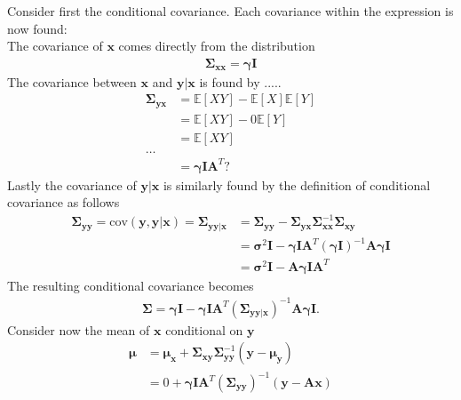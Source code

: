 Consider first the conditional covariance. Each covariance within the expression is now found:
\\
The covariance of $\textbf{x}$ comes directly from the distribution  
\begin{align*}
\boldsymbol{\Sigma}_{\textbf{xx}} = \boldsymbol{\gamma}\textbf{I}
\end{align*} 
The covariance between $\textbf{x}$ and $\textbf{y}\vert\textbf{x}$ is found by .....
\begin{align*}
\boldsymbol{\Sigma}_{\textbf{yx}} &= \mathbb{E}[XY] - \mathbb{E}[X]\mathbb{E}[Y]\\
&= \mathbb{E}[XY] - 0 \mathbb{E}[Y] \\
&= \mathbb{E}[XY]\\
\hdots \\
&= \boldsymbol{\gamma}\textbf{I}\textbf{A}^T?
\end{align*}
Lastly the covariance of $\textbf{y}\vert \textbf{x}$ is similarly found by the definition of conditional covariance as follows 
\begin{align*}
\boldsymbol{\Sigma}_{\textbf{yy}} =  \text{cov}(\textbf{y},\textbf{y}\vert \textbf{x}) = \boldsymbol{\Sigma}_{\textbf{yy}\vert \textbf{x}} &= \boldsymbol{\Sigma}_{\textbf{yy}} - \boldsymbol{\Sigma}_{\textbf{yx}}\boldsymbol{\Sigma}_{\textbf{xx}}^{-1}\boldsymbol{\Sigma}_{\textbf{xy}} \\
&= \boldsymbol{\sigma}^2 \textbf{I} - \boldsymbol{\gamma}\textbf{I}\textbf{A}^T (\boldsymbol{\gamma}\textbf{I})^{-1} \textbf{A}\boldsymbol{\gamma}\textbf{I} \\
&= \boldsymbol{\sigma}^2 \textbf{I} - \textbf{A}\boldsymbol{\gamma}\textbf{I}\textbf{A}^T
\end{align*} 
The resulting conditional covariance becomes 
\begin{align*}
\boldsymbol{\Sigma} = \boldsymbol{\gamma}\textbf{I} - \boldsymbol{\gamma}\textbf{I}\textbf{A}^T (\boldsymbol{\Sigma}_{\textbf{yy}\vert \textbf{x}})^{-1} \textbf{A} \boldsymbol{\gamma}\textbf{I}.
\end{align*}
Consider now the mean of $\textbf{x}$ conditional on $\textbf{y}$
\begin{align*}
\boldsymbol{\mu} &= \boldsymbol{\mu}_{\textbf{x}}+\boldsymbol{\Sigma}_{\textbf{xy}}\boldsymbol{\Sigma}_{\textbf{yy}}^{-1}\left( \textbf{y}-\boldsymbol{\mu}_{\textbf{y}}\right) \\
&= 0 + \boldsymbol{\gamma}\textbf{I}\textbf{A}^T \left( \boldsymbol{\Sigma}_{\textbf{yy}}\right)^{-1}\left(\textbf{y}-\textbf{Ax}\right)
\end{align*}  

